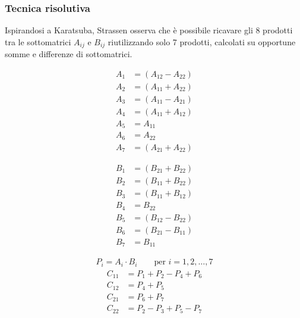 \subsubsection*{Tecnica risolutiva}
Ispirandosi a Karatsuba, Strassen osserva che è possibile ricavare gli 8 prodotti tra le sottomatrici \(A_{ij}\) e \(B_{ij}\)
riutilizzando solo 7 prodotti, calcolati su opportune somme e differenze di sottomatrici.
\vspace{-12pt}
\begin{center}
	\begin{minipage}{0.25\textwidth}
		\begin{align*}
			A_1 &= (A_{12} - A_{22}) \\
			A_2 &= (A_{11} + A_{22}) \\
			A_3 &= (A_{11} - A_{21}) \\
			A_4 &= (A_{11} + A_{12}) \\
			A_5 &= A_{11} \\
			A_6 &= A_{22} \\
			A_7 &= (A_{21} + A_{22})
		\end{align*}
	\end{minipage}
	\begin{minipage}{0.25\textwidth}
		\begin{align*}
			B_1 &= (B_{21} + B_{22}) \\
			B_2 &= (B_{11} + B_{22}) \\
			B_3 &= (B_{11} + B_{12}) \\
			B_4 &= B_{22} \\
			B_5 &= (B_{12} - B_{22}) \\
			B_6 &= (B_{21} - B_{11}) \\
			B_7 &= B_{11}
		\end{align*}
	\end{minipage}
	\begin{minipage}{0.4\textwidth}
		\begin{align*}
			P_i = A_i \cdot B_i \qquad \text{per } i = 1, 2, \dotsc, 7
		\end{align*}
		\vspace{-20pt}
		\begin{align*}
			C_{11} &= P_1 + P_2 - P_4 + P_6 \\
			C_{12} &= P_4 + P_5 \\
			C_{21} &= P_6 + P_7 \\
			C_{22} &= P_2 - P_3 + P_5 - P_7
		\end{align*}
	\end{minipage}
\end{center}

